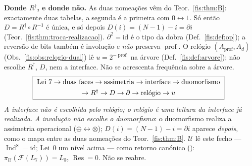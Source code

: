 \documentclass[livro.tex]{subfiles}
\begin{document}
\begin{observacao}
\medskip\noindent\textbf{Donde $R^{\dagger}$, e donde não.} As duas nomeações
vêm do Teor.~\ref{fis:thm:B}: exactamente duas tabelas, a segunda é a primeira
com $0\leftrightarrow 1$. Só então $D=R^{\dagger}\circ R^{-1}$ é única, e só
depois $D(i)=(N-1)-i=\partial i$ (Teor.~\ref{fis:thm:troca-realizacao}).
$\partial^{2}=\mathrm{id}$ é o tipo da dobra (Def.~\ref{fis:def:op}); a reversão
de bits também é involução e \emph{não} preserva $\operatorname{prof}$. O
relógio $(A_{\mathrm{prof}},A_d)$ (Obs.~\ref{fis:obs:relogio-dual}) lê
$u=2^{-\operatorname{prof}}$ na árvore (Def.~\ref{fis:def:arvore}); não escolhe
$R^{\dagger}$, $D$, nem a interface. Não se acrescenta frequência sobre a
árvore.
\[
\boxed{\;
\begin{array}{@{}c@{}}
\text{Lei~7}\to\text{duas faces}\to\text{assimetria}\to\text{interface}
\to\text{duomorfismo}\\[4pt]
\to R^{\dagger}\to D\to\partial\to\text{relógio}\to u
\end{array}
\;}
\]
\emph{A interface não é escolhida pelo relógio; o relógio é uma leitura da
interface já realizada.} \emph{A involução não escolhe o duomorfismo}: o
duomorfismo realiza a assimetria operacional ($\oplus\leftrightarrow\otimes$);
$D(i)=(N-1)-i=\partial i$ aparece \emph{depois}, como o mapa entre as duas
nomeações do Teor.~\ref{fis:thm:B}.
\(\mathcal{U}\) lê este fecho --- \(\operatorname{Ind}^{8}=\mathrm{id}\);
Lei~0 um nível acima --- como retorno canónico
():
\(\pi_{\mathcal{U}}(\mathcal{F}(L_7))=L_0\), \(\operatorname{Res}=0\).
Não se reabre.
\end{observacao}
\end{document}
